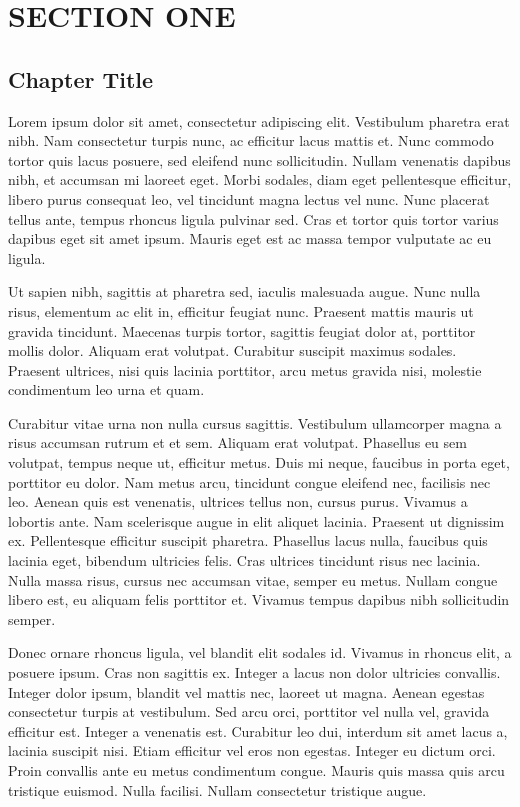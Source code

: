 \documentclass[a4paper]{memoir}
\begin{document}
\part{SECTION ONE}
\label{sectionone}

\chapter{Chapter Title}
\label{chapteronetitle}

Lorem ipsum dolor sit amet, consectetur adipiscing elit. Vestibulum pharetra erat nibh. Nam consectetur turpis nunc, ac efficitur lacus mattis et. Nunc commodo tortor quis lacus posuere, sed eleifend nunc sollicitudin. Nullam venenatis dapibus nibh, et accumsan mi laoreet eget. Morbi sodales, diam eget pellentesque efficitur, libero purus consequat leo, vel tincidunt magna lectus vel nunc. Nunc placerat tellus ante, tempus rhoncus ligula pulvinar sed. Cras et tortor quis tortor varius dapibus eget sit amet ipsum. Mauris eget est ac massa tempor vulputate ac eu ligula. 

Ut sapien nibh, sagittis at pharetra sed, iaculis malesuada augue. Nunc nulla risus, elementum ac elit in, efficitur feugiat nunc. Praesent mattis mauris ut gravida tincidunt. Maecenas turpis tortor, sagittis feugiat dolor at, porttitor mollis dolor. Aliquam erat volutpat. Curabitur suscipit maximus sodales. Praesent ultrices, nisi quis lacinia porttitor, arcu metus gravida nisi, molestie condimentum leo urna et quam. 

Curabitur vitae urna non nulla cursus sagittis. Vestibulum ullamcorper magna a risus accumsan rutrum et et sem. Aliquam erat volutpat. Phasellus eu sem volutpat, tempus neque ut, efficitur metus. Duis mi neque, faucibus in porta eget, porttitor eu dolor. Nam metus arcu, tincidunt congue eleifend nec, facilisis nec leo. Aenean quis est venenatis, ultrices tellus non, cursus purus. Vivamus a lobortis ante. Nam scelerisque augue in elit aliquet lacinia. Praesent ut dignissim ex. Pellentesque efficitur suscipit pharetra. Phasellus lacus nulla, faucibus quis lacinia eget, bibendum ultricies felis. Cras ultrices tincidunt risus nec lacinia. Nulla massa risus, cursus nec accumsan vitae, semper eu metus. Nullam congue libero est, eu aliquam felis porttitor et. Vivamus tempus dapibus nibh sollicitudin semper. 

Donec ornare rhoncus ligula, vel blandit elit sodales id. Vivamus in rhoncus elit, a posuere ipsum. Cras non sagittis ex. Integer a lacus non dolor ultricies convallis. Integer dolor ipsum, blandit vel mattis nec, laoreet ut magna. Aenean egestas consectetur turpis at vestibulum. Sed arcu orci, porttitor vel nulla vel, gravida efficitur est. Integer a venenatis est. Curabitur leo dui, interdum sit amet lacus a, lacinia suscipit nisi. Etiam efficitur vel eros non egestas. Integer eu dictum orci. Proin convallis ante eu metus condimentum congue. Mauris quis massa quis arcu tristique euismod. Nulla facilisi. Nullam consectetur tristique augue. 
\end{document}
